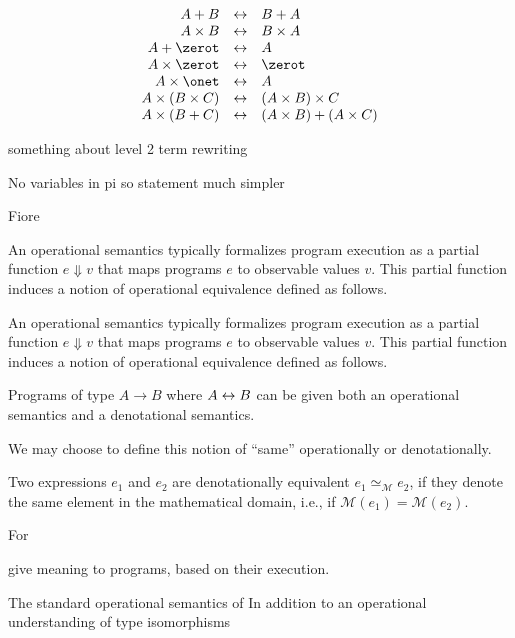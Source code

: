 \[\begin{array}{rcl}
    A \sumt B &\isot& B \sumt A \\
    A \prodt B &\isot& B \prodt A \\
    A \sumt \zerot &\isot& A \\
    A \prodt \zerot &\isot& \zerot \\
    A \prodt \onet &\isot& A \\
    A \prodt (B \prodt C) &\isot& (A \prodt B) \prodt C \\
    A \prodt (B \sumt C) &\isot& (A \prodt B) \sumt (A \prodt C)
  \end{array}\]

something about level 2 term rewriting


No variables in pi so statement much simpler

Fiore


An operational semantics typically formalizes
program execution as a partial function $e \Downarrow v$ that maps programs $e$
to observable values $v$. This partial function induces a notion of operational
equivalence defined as follows.



An operational semantics typically formalizes
program execution as a partial function $e \Downarrow v$ that maps programs $e$
to observable values $v$. This partial function induces a notion of operational
equivalence defined as follows.



Programs of type $A \rightarrow B$ where $A \leftrightarrow B$ can be given both an
operational semantics and a denotational semantics.


We may choose to define this notion of ``same'' operationally or
denotationally.


\begin{definition}
  Two expressions $e_1$ and $e_2$ are denotationally equivalent
  $e_1 \simeq_{\mathcal{M}} e_2$, if they denote the same element in the
  mathematical domain, i.e., if $\mathcal{M}(e_1) = \mathcal{M}(e_2)$.
\end{definition}

For


give meaning to programs, based on their execution.

The standard operational semantics of In addition to an operational understanding of type isomorphisms

